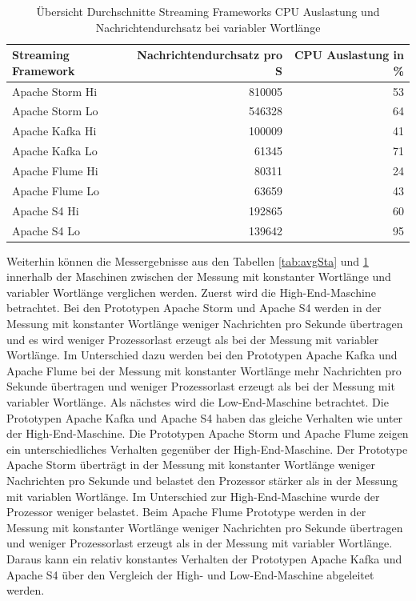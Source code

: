 \begin{table}[!ht]
	\centering
		\begin{tabular}{@{}lrr@{}} \toprule
			\textbf{Streaming Framework} & \textbf{Nachrichtendurchsatz pro S} & \textbf{CPU Auslastung in \%} \\ \midrule
			Apache Storm Hi & 810005 & 53 \\
			Apache Storm Lo & 546328 & 64 \\			
			Apache Kafka Hi & 100009 & 41 \\
			Apache Kafka Lo & 61345 & 71 \\
			Apache Flume Hi & 80311 & 24 \\
			Apache Flume Lo & 63659 & 43 \\
			Apache S4 Hi & 192865 & 60 \\
			Apache S4 Lo & 139642 & 95 \\
			\bottomrule			
		\end{tabular}
	\caption{Übersicht Durchschnitte Streaming Frameworks CPU Auslastung und Nachrichtendurchsatz bei variabler Wortlänge}
	\label{tab:avgDyn}
\end{table}

Weiterhin können die Messergebnisse aus den Tabellen \ref{tab:avgSta} und \ref{tab:avgDyn} innerhalb der Maschinen zwischen der Messung mit konstanter Wortlänge und variabler Wortlänge verglichen werden. Zuerst wird die High-End-Maschine betrachtet. Bei den Prototypen Apache Storm und Apache S4 werden in der Messung mit konstanter Wortlänge weniger Nachrichten pro Sekunde übertragen und es wird weniger Prozessorlast erzeugt als bei der Messung mit variabler Wortlänge. Im Unterschied dazu werden bei den Prototypen Apache Kafka und Apache Flume bei der Messung mit konstanter Wortlänge mehr Nachrichten pro Sekunde übertragen und weniger Prozessorlast erzeugt als bei der Messung mit variabler Wortlänge. Als nächstes wird die Low-End-Maschine betrachtet. Die Prototypen Apache Kafka und Apache S4 haben das gleiche Verhalten wie unter der High-End-Maschine. Die Prototypen Apache Storm und Apache Flume zeigen ein unterschiedliches Verhalten gegenüber der High-End-Maschine. Der Prototype Apache Storm überträgt in der Messung mit konstanter Wortlänge weniger Nachrichten pro Sekunde und belastet den Prozessor stärker als in der Messung mit variablen Wortlänge. Im Unterschied zur High-End-Maschine wurde der Prozessor weniger belastet. Beim Apache Flume Prototype werden in der Messung mit konstanter Wortlänge weniger Nachrichten pro Sekunde übertragen und weniger Prozessorlast erzeugt als in der Messung mit variabler Wortlänge. Daraus kann ein relativ konstantes Verhalten der Prototypen Apache Kafka und Apache S4 über den Vergleich der High- und Low-End-Maschine abgeleitet werden.

